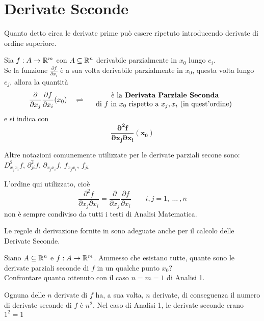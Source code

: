 \section{Derivate Seconde}
Quanto detto circa le derivate prime può essere ripetuto introducendo derivate di ordine superiore.
\begin{definition}
	Sia $f: A \to \mathbb{R}^m$ con $A \subseteq \mathbb{R}^n$ derivabile parzialmente in $x_0$ lungo $e_i$.\\
	Se la funzione $\frac{\partial f}{\partial x_i}$ è a sua volta derivabile parzialmente in $x_0$, questa volta lungo $e_j$, allora la quantità
	\[
		\frac{\partial}{\partial x_j} \frac{\partial f}{\partial x_i} (x_0)
		\quad \rightleftharpoons \quad
		\begin{array}{c}
			\text{ è la \textbf{Derivata Parziale Seconda}}\\
			\text{di } f \text{ in } x_0 \text{ rispetto a } x_j, x_i \text{ (in quest'ordine)}
		\end{array}
	\]
	e si indica con
	\[\boldsymbol{\frac{\partial^2 f}{\partial x_j \partial x_i} (x_0)}\]
	\vspace*{-\baselineskip}
	\begin{note}
		Altre notazioni comunemente utilizzate per le derivate parziali secone sono: $D^2_{x_j x_i} f$, $\partial^2_{ji} f$, $\partial_{x_j x_i} f$, $f_{x_j x_i}$, $f_{ji}$
	\end{note}
	\begin{note}
		L'ordine qui utilizzato, cioè
		\[\frac{\partial^2 f}{\partial x_j \partial x_i} = \frac{\partial}{\partial x_j} \frac{\partial f}{\partial x_i} \qquad i,j = 1,\:\dotsc\:,n\]
		non è sempre condiviso da tutti i testi di Analisi Matematica.
	\end{note}
\end{definition}
\begin{observation}
	Le regole di derivazione fornite in  sono adeguate anche per il calcolo delle Derivate Seconde.
\end{observation}
\begin{exercise}
	\label{ex:num_deriv_sec}
	Siano $A \subseteq \mathbb{R}^n$ e $f:A \to \mathbb{R}^m$. Ammesso che esistano tutte, quante sono le derivate parziali seconde di $f$ in un qualche punto $x_0$?\\
	Confrontare quanto ottenuto con il caso $n = m = 1$ di Analisi 1.
	\begin{solution}
		Ognuna delle $n$ derivate di $f$ ha, a sua volta, $n$ derivate, di conseguenza il numero di derivate seconde di $f$ è $n^2$. Nel caso di Analisi 1, le derivate seconde erano $1^2 = 1$
	\end{solution}
\end{exercise}

